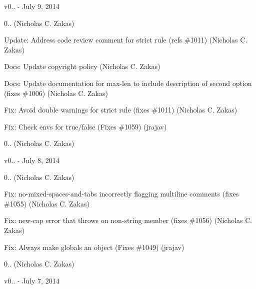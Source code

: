 v0.. -\/ July 9, 2014


\begin{DoxyItemize}
\item 0.. (Nicholas C. Zakas)
\item Update\+: Address code review comment for strict rule (refs \#1011) (Nicholas C. Zakas)
\item Docs\+: Update copyright policy (Nicholas C. Zakas)
\item Docs\+: Update documentation for max-\/len to include description of second option (fixes \#1006) (Nicholas C. Zakas)
\item Fix\+: Avoid double warnings for strict rule (fixes \#1011) (Nicholas C. Zakas)
\item Fix\+: Check envs for true/false (Fixes \#1059) (jrajav)
\item 0.. (Nicholas C. Zakas)
\end{DoxyItemize}

v0.. -\/ July 8, 2014


\begin{DoxyItemize}
\item 0.. (Nicholas C. Zakas)
\item Fix\+: no-\/mixed-\/spaces-\/and-\/tabs incorrectly flagging multiline comments (fixes \#1055) (Nicholas C. Zakas)
\item Fix\+: new-\/cap error that throws on non-\/string member (fixes \#1056) (Nicholas C. Zakas)
\item Fix\+: Always make globals an object (Fixes \#1049) (jrajav)
\item 0.. (Nicholas C. Zakas)
\end{DoxyItemize}

v0.. -\/ July 7, 2014


